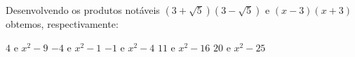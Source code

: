 Desenvolvendo os produtos notáveis $(3+\sqrt{5})(3-\sqrt{5})$ e $(x-3)(x+3)$ obtemos, respectivamente:

$4$ e $x^2-9$
$-4$ e $x^2-1$
$-1$ e $x^2-4$
$11$ e $x^2-16$
$20$ e $x^2-25$


